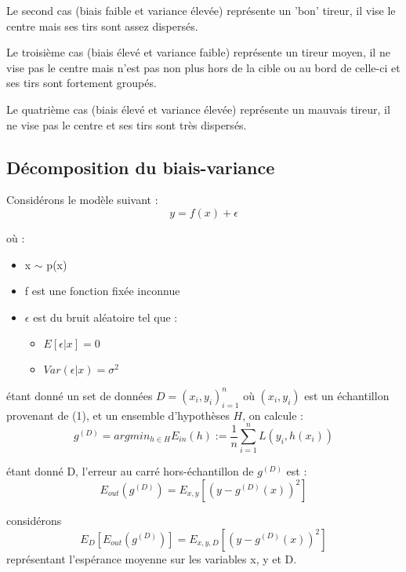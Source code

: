 \documentclass[a4paper]{article}
\begin{document}
Le second cas (biais faible et variance élevée) représente un 'bon' tireur, il vise le centre mais ses tirs sont assez dispersés. \par

Le troisième cas (biais élevé et variance faible) représente un tireur moyen, il ne vise pas le centre mais n'est pas non plus hors de la cible ou au bord de celle-ci et ses tirs sont fortement groupés. \par

Le quatrième cas (biais élevé et variance élevée) représente un mauvais tireur, il ne vise pas le centre et ses tirs sont très dispersés. \par

\newpage

\subsection{Décomposition du biais-variance}
\label{decomposition_Biais_Variance_section}

Considérons le modèle suivant : 
\begin{equation}
\label{decomposition_Biais_Variance}
y = f(x) + \epsilon
\end{equation}

où : 

\begin{itemize}
	\item x $\sim$ p(x)
	\item f est une fonction fixée inconnue
	\item $\epsilon$ est du bruit aléatoire tel que :
	\begin{itemize}
		\item $E[\epsilon|x] = 0$
		\item $Var(\epsilon|x) = \sigma^2$
	\end{itemize}
\end{itemize}


étant donné un set de données $D = {(x_i, y_i)}^n_{i=1}$ où $(x_i, y_i)$ est un échantillon provenant de (1), et un ensemble d'hypothèses $H$, on calcule : \newline
\[ g^{(D)} = argmin_{h\in H}  E_{in}(h) := \frac{1}{n} \sum_{i=1}^{n} L(y_i,h(x_i)) \]

étant donné D, l'erreur au carré hors-échantillon de $g^{(D)}$ est : \newline
\[ E_{out}(g^{(D)}) = E_{x,y}[(y - g^{(D)}(x))^2] \]

considérons 
\begin{equation}
E_D[E_{out}(g^{(D)})] = E_{x,y,D}[(y - g^{(D)}(x))^2]
\end{equation}
représentant l'espérance moyenne sur les variables x, y et D. \newline
\end{document}
